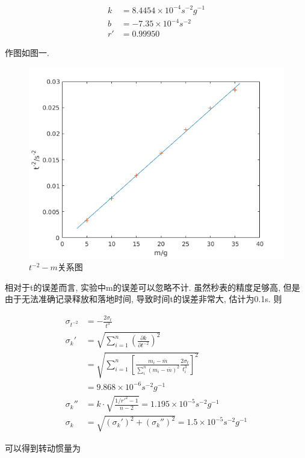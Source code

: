 \documentclass[a4paper,12pt,notitlepage]{article}
\begin{document}
\begin{align*}
	k &= 8.4454 \times 10^{-4} s^{-2}g^{-1} \\
	b &= -7.35 \times 10^{-4} s^{-2} \\
	r' &= 0.99950 	
\end{align*}

	作图如图一. \\
	
\begin{figure}[h]
\centering
	\includegraphics[scale=0.7]{figure_1.png}
	\caption{$t^{-2} - m$关系图}
\end{figure}

	相对于t的误差而言, 实验中m的误差可以忽略不计. 虽然秒表的精度足够高, 但是由于无法准确记录释放和落地时间, 导致时间t的误差非常大, 估计为0.1s. 则
	
\begin{align*}
	\sigma_{t^{-2}} &= -\frac{2\sigma_t}{t^3} \\
	\sigma_k' &= \sqrt{\sum_{i = 1}^n(\frac{\partial k}{\partial t^{-2}})^2} \\
	&= \sqrt{\sum_{i = 1}^n[\frac{m_i - \bar{m}}{\sum_i^n(m_i - \bar{m})^2}\frac{2\sigma_t}{t_i^3}]^2} \\
	&= 9.868 \times 10^{-6} s^{-2}g^{-1} \\
	\sigma_k'' &= k\cdot \sqrt{\frac{1/r'^2 - 1}{n -2}} = 1.195 \times 10^{-5} s^{-2}g^{-1} \\
	\sigma_k &= \sqrt{(\sigma_k')^2 + (\sigma_k'')^2} = 1.5\times 10^{-5} s^{-2}g^{-1}
\end{align*} 

	可以得到转动惯量为
	
\end{document}

